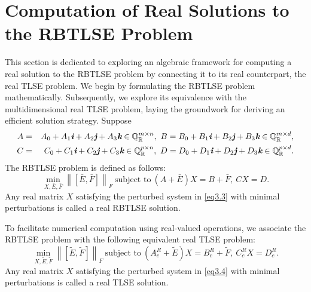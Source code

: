 \documentclass[preprint,11pt,3p]{elsarticle}
\newcommand\norm[1]{\left\lVert#1\right\rVert}
\def \QR{\mathbb{Q}_\mathbb{R}}
\def \i{\textit{\textbf{i}}}
\def \j{\textit{\textbf{j}}}
\def \k{\textit{\textbf{k}}}
\begin{document}
\section{Computation of Real Solutions to the RBTLSE Problem}\label{sec3}
This section is dedicated to exploring an algebraic framework for computing a real solution to the RBTLSE problem by connecting it to its real counterpart, the real TLSE problem. We begin by formulating the RBTLSE problem mathematically. Subsequently, we explore its equivalence with the multidimensional real TLSE problem, laying the groundwork for deriving an efficient solution strategy. 
Suppose 
\begin{eqnarray}
	A&=& A_0+ A_1\i+ A_2\j+ A_3\k \in  \QR^{m \times n}, ~ B= B_0+ B_1\i+ B_2\j+ B_3\k \in \QR^{m \times d}, \label{eq3.1} \\ 
	C&=& C_0+ C_1\i+ C_2\j+ C_3\k \in  \QR^{p \times n}, ~ D= D_0+ D_1\i+ D_2\j+ D_3\k \in \QR^{p \times d}. \label{eq3.2}
\end{eqnarray}
The RBTLSE problem is defined as follows:
\begin{equation}\label{eq3.3}
	\min_{X,\bar{E},\bar{F}}\norm{[\bar{E}, \bar{F}]}_F ~ \textrm{subject to} ~  (A+\bar{E})X = B+\bar{F}, ~ CX=D. 
\end{equation} 
Any real matrix $X$ satisfying the perturbed system in \eqref{eq3.3} with minimal perturbations is called a real RBTLSE solution.

To facilitate numerical computation using real-valued operations, we associate the RBTLSE problem with the following equivalent real TLSE problem:
\begin{equation}\label{eq3.4}
	\min_{X,\widetilde{E}, \widetilde{F}} \norm{[\widetilde{E}, \widetilde{F}]}_F ~ \textrm{subject to} ~ (A^R_c+\widetilde{E})X=B^R_c+ \widetilde{F}, ~ C^R_cX=D^R_c.
\end{equation}
Any real matrix $X$ satisfying the perturbed system in \eqref{eq3.4} with minimal perturbations is called a real TLSE solution.
\end{document}
